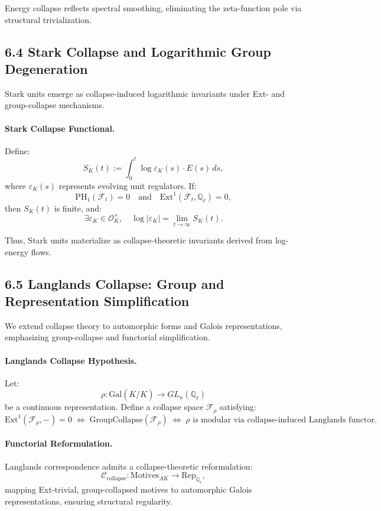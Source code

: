 \documentclass[11pt]{article}
\begin{document}
Energy collapse reflects spectral smoothing, eliminating the zeta-function pole via structural trivialization.

\subsection*{6.4 Stark Collapse and Logarithmic Group Degeneration}

Stark units emerge as collapse-induced logarithmic invariants under Ext- and group-collapse mechanisms.

\paragraph{Stark Collapse Functional.}
Define:
\[
S_K(t) := \int_0^t \log \varepsilon_K(s) \cdot E(s)\, ds,
\]
where \( \varepsilon_K(s) \) represents evolving unit regulators. If:
\[
\mathrm{PH}_1(\mathcal{F}_t) = 0 \quad \text{and} \quad \mathrm{Ext}^1(\mathcal{F}_t, \mathbb{Q}_\ell) = 0,
\]
then \( S_K(t) \) is finite, and:
\[
\exists \varepsilon_K \in \mathcal{O}_K^\times, \quad \log |\varepsilon_K| = \lim_{t \to \infty} S_K(t).
\]

Thus, Stark units materialize as collapse-theoretic invariants derived from log-energy flows.

\subsection*{6.5 Langlands Collapse: Group and Representation Simplification}

We extend collapse theory to automorphic forms and Galois representations, emphasizing group-collapse and functorial simplification.

\paragraph{Langlands Collapse Hypothesis.}
Let:
\[
\rho: \mathrm{Gal}(\overline{K}/K) \to GL_n(\mathbb{Q}_\ell)
\]
be a continuous representation. Define a collapse space \( \mathcal{F}_\rho \) satisfying:
\[
\mathrm{Ext}^1(\mathcal{F}_\rho, -) = 0 \;\Leftrightarrow\; \text{GroupCollapse}(\mathcal{F}_\rho) \;\Leftrightarrow\; \rho \text{ is modular via collapse-induced Langlands functor}.
\]

\paragraph{Functorial Reformulation.}
Langlands correspondence admits a collapse-theoretic reformulation:
\[
\mathcal{C}_{\mathrm{collapse}}: \mathrm{Motives}_{AK} \longrightarrow \mathrm{Rep}_{\mathbb{Q}_\ell},
\]
mapping Ext-trivial, group-collapsed motives to automorphic Galois representations, ensuring structural regularity.
\end{document}
